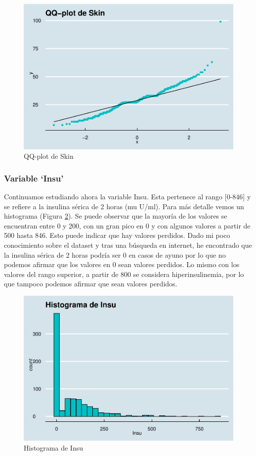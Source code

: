 \documentclass[
]{article}
\begin{document}
\begin{figure}

{\centering \includegraphics[width=0.5\linewidth]{pima-clasificacion_files/figure-latex/qq_skin-1} 

}

\caption{QQ-plot de Skin}\label{fig:qq_skin}
\end{figure}

\hypertarget{variable-insu}{%
\subsubsection{Variable `Insu'}\label{variable-insu}}

Continuamos estudiando ahora la variable Insu. Esta pertenece al rango
{[}0-846{]} y se refiere a la insulina sérica de 2 horas (mu U/ml). Para
más detalle vemos un histograma (Figura \ref{fig:hist_insu}). Se puede
observar que la mayoría de los valores se encuentran entre 0 y 200, con
un gran pico en 0 y con algunos valores a partir de 500 hasta 846. Esto
puede indicar que hay valores perdidos. Dado mi poco conocimiento sobre
el dataset y tras una búsqueda en internet, he encontrado que la
insulina sérica de 2 horas podría ser 0 en casos de ayuno por lo que no
podemos afirmar que los valores en 0 sean valores perdidos. Lo mismo con
los valores del rango superior, a partir de 800 se considera
hiperinsulinemia, por lo que tampoco podemos afirmar que sean valores
perdidos.

\begin{figure}

{\centering \includegraphics[width=0.5\linewidth]{pima-clasificacion_files/figure-latex/hist_insu-1} 

}

\caption{Histograma de Insu}\label{fig:hist_insu}
\end{figure}
\end{document}

